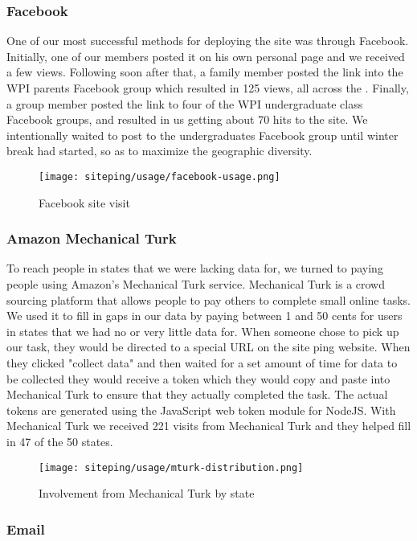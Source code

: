 \subsubsection{Facebook}

One of our most successful methods for deploying the site was through Facebook. Initially, one of our members posted it on his own personal page and we received a few views. Following soon after that, a family member posted the link into the WPI parents Facebook group which resulted in 125 views, all across the \us. Finally, a group member posted the link to four of the WPI undergraduate class Facebook groups, and resulted in us getting about 70 hits to the site. We intentionally waited to post to the \wpi undergraduates Facebook group until winter break had started, so as to maximize the geographic diversity.

\begin{figure}[h]
    \centering
    \texttt{[image: siteping/usage/facebook-usage.png]}
    \caption{Facebook site visit}
    \label{fig:siteping_facebook_usage}
\end{figure}

\subsubsection{Amazon Mechanical Turk}

To reach people in states that we were lacking data for, we turned to paying people using Amazon's Mechanical Turk service. Mechanical Turk is a crowd sourcing platform that allows people to pay others to complete small online tasks. We used it to fill in gaps in our data by paying between 1 and 50 cents for users in states that we had no or very little data for. When someone chose to pick up our task, they would be directed to a special URL on the site ping website. When they clicked "collect data" and then waited for a set amount of time for data to be collected they would receive a token which they would copy and paste into Mechanical Turk to ensure that they actually completed the task. The actual tokens are generated using the JavaScript web token module for NodeJS. With Mechanical Turk we received 221 visits from Mechanical Turk and they helped fill in 47 of the 50 states.

\begin{figure}[h]
    \centering
    \texttt{[image: siteping/usage/mturk-distribution.png]}
    \caption{Involvement from Mechanical Turk by state}
    \label{fig:siteping_mturk_distribution}
\end{figure}

\subsubsection{Email}
